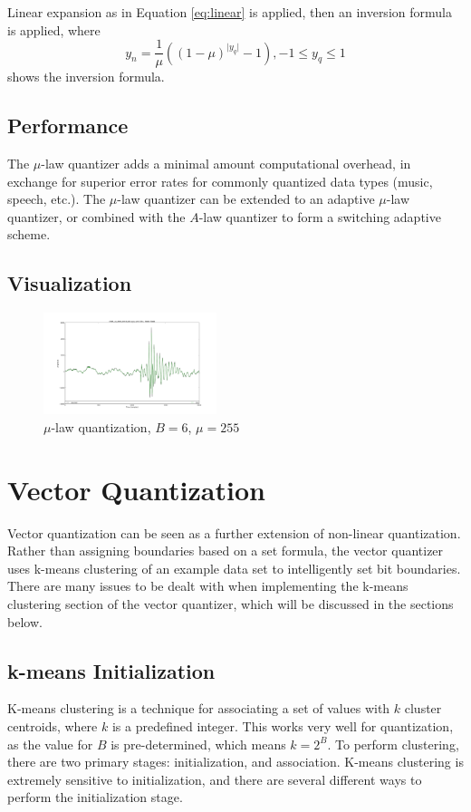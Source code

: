 \documentclass[journal]{IEEEtran}
\begin{document}
Linear expansion as in Equation \ref{eq:linear} is applied, then an inversion formula is applied, where  
\begin{equation}
    y_n = \frac{1}{\mu}((1-\mu)^{\lvert y_q \rvert}-1), -1 \le y_q \le 1
\end{equation}
shows the inversion formula.

\subsection{Performance}
The $\mu$-law quantizer adds a minimal amount computational overhead, in exchange for superior error rates for commonly quantized data types
(music, speech, etc.). The $\mu$-law quantizer can be extended to an adaptive $\mu$-law quantizer, or combined with the $A$-law quantizer to
form a switching adaptive scheme.

\subsection{Visualization}
\begin{figure}[h!]
\centering
  \includegraphics[width=0.45\textwidth]{mu_6bit.png}
\caption{$\mu$-law quantization, $B = 6$, $\mu = 255$}
\label{fig:linear}
\end{figure}

\section{Vector Quantization}
Vector quantization can be seen as a further extension of non-linear quantization. Rather than assigning boundaries based on a set formula, the 
vector quantizer uses k-means clustering of an example data set to intelligently set bit boundaries. There are many issues to be dealt with 
when implementing the k-means clustering section of the vector quantizer, which will be discussed in the sections below.
\subsection{k-means Initialization}
K-means clustering is a technique for associating a set of values with $k$ cluster centroids, where $k$ is a predefined integer. This works very well for 
quantization, as the value for $B$ is pre-determined, which means $k = 2^B$. To perform clustering, there are two primary stages: initialization, 
and association. K-means clustering is extremely sensitive to initialization, and there are several different ways to perform the initialization stage. 
\end{document}
